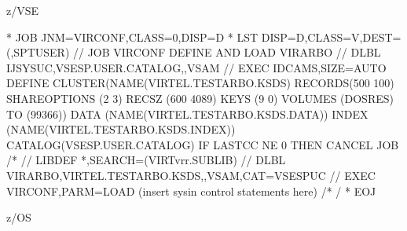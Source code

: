 \documentclass[letterpaper,10pt,english]{sphinxmanual}
\begin{document}
z/VSE

\begin{sphinxVerbatim}[commandchars=\\\{\}]
* \PYGZdl{}\PYGZdl{} JOB JNM=VIRCONF,CLASS=0,DISP=D
* \PYGZdl{}\PYGZdl{} LST DISP=D,CLASS=V,DEST=(,SPTUSER)
// JOB VIRCONF DEFINE AND LOAD VIRARBO
// DLBL IJSYSUC,\PYGZsq{}VSESP.USER.CATALOG\PYGZsq{},,VSAM
// EXEC IDCAMS,SIZE=AUTO
        DEFINE CLUSTER(NAME(VIRTEL.TESTARBO.KSDS) \PYGZhy{}
              RECORDS(500 100) SHAREOPTIONS (2 3) \PYGZhy{}
              RECSZ (600 4089) KEYS (9 0) \PYGZhy{}
              VOLUMES (DOSRES) TO (99366))\PYGZhy{}
        DATA (NAME(VIRTEL.TESTARBO.KSDS.DATA)) \PYGZhy{}
        INDEX (NAME(VIRTEL.TESTARBO.KSDS.INDEX)) \PYGZhy{}
              CATALOG(VSESP.USER.CATALOG)
IF LASTCC NE 0 THEN CANCEL JOB
/*
// LIBDEF *,SEARCH=(VIRTvrr.SUBLIB)
// DLBL VIRARBO,\PYGZsq{}VIRTEL.TESTARBO.KSDS\PYGZsq{},,VSAM,CAT=VSESPUC
// EXEC VIRCONF,PARM=\PYGZsq{}LOAD\PYGZsq{}
        (insert sysin control statements here)
/*
/\PYGZam{}
* \PYGZdl{}\PYGZdl{} EOJ
\end{sphinxVerbatim}


\ignorespaces 
z/OS
\end{document}
